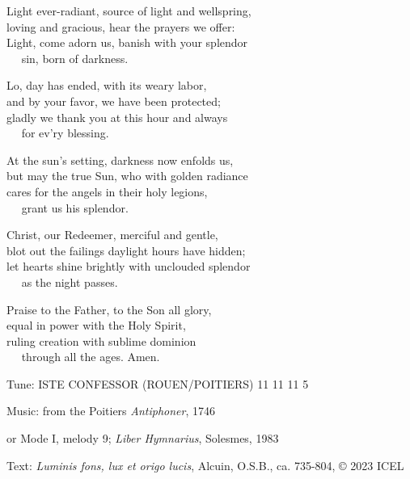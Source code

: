 \hymn

\begin{hymnverse}
Light ever-radiant, source of light and wellspring,\\
loving and gracious, hear the prayers we offer:\\
Light, come adorn us, banish with your splendor\\
   sin, born of darkness.

Lo, day has ended, with its weary labor,\\
and by your favor, we have been protected;\\
gladly we thank you at this hour and always\\
   for ev’ry blessing.

At the sun’s setting, darkness now enfolds us,\\
but may the true Sun, who with golden radiance\\
cares for the angels in their holy legions,\\
   grant us his splendor.

Christ, our Redeemer, merciful and gentle,\\
blot out the failings daylight hours have hidden;\\
let hearts shine brightly with unclouded splendor\\
   as the night passes.

Praise to the Father, to the Son all glory,\\
equal in power with the Holy Spirit,\\
ruling creation with sublime dominion\\
   through all the ages. Amen.
\end{hymnverse}

\begin{hymnsource}
Tune: ISTE CONFESSOR (ROUEN/POITIERS) 11 11 11 5

Music: from the Poitiers \emph{Antiphoner}, 1746

or Mode I, melody 9; \emph{Liber Hymnarius}, Solesmes, 1983

Text: \emph{Luminis fons, lux et origo lucis}, Alcuin, O.S.B., ca. 735-804, © 2023 ICEL
\end{hymnsource}